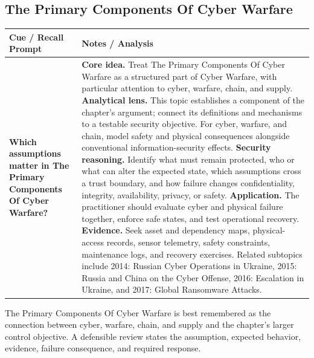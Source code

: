 \documentclass[11pt]{article}
\newcommand{\CornellHeader}{%
\rowcolor{Navy}\color{white}\bfseries Cue / Recall Prompt & \color{white}\bfseries Notes / Analysis\\\hline}
\newcommand{\CornellRow}[2]{%
\cellcolor{CueGray}\RaggedRight\textbf{#1} & \RaggedRight #2\\\hline}
\begin{document}
\subsection*{The Primary Components Of Cyber Warfare}
\begin{longtable}{>{\RaggedRight\arraybackslash}p{}|>{\RaggedRight\arraybackslash}p{}}
\CornellHeader
\CornellRow{Which assumptions matter in The Primary Components Of Cyber Warfare?}{\textbf{Core idea.} Treat The Primary Components Of Cyber Warfare as a structured part of Cyber Warfare, with particular attention to cyber, warfare, chain, and supply. \textbf{Analytical lens.} This topic establishes a component of the chapter's argument; connect its definitions and mechanisms to a testable security objective. For cyber, warfare, and chain, model safety and physical consequences alongside conventional information-security effects. \textbf{Security reasoning.} Identify what must remain protected, who or what can alter the expected state, which assumptions cross a trust boundary, and how failure changes confidentiality, integrity, availability, privacy, or safety. \textbf{Application.} The practitioner should evaluate cyber and physical failure together, enforce safe states, and test operational recovery. \textbf{Evidence.} Seek asset and dependency maps, physical-access records, sensor telemetry, safety constraints, maintenance logs, and recovery exercises. Related subtopics include 2014: Russian Cyber Operations in Ukraine, 2015: Russia and China on the Cyber Offense, 2016: Escalation in Ukraine, and 2017: Global Ransomware Attacks.}
\end{longtable}
\begin{topicsummary}
The Primary Components Of Cyber Warfare is best remembered as the connection between cyber, warfare, chain, and supply and the chapter's larger control objective. A defensible review states the assumption, expected behavior, evidence, failure consequence, and required response.
\end{topicsummary}
\end{document}
